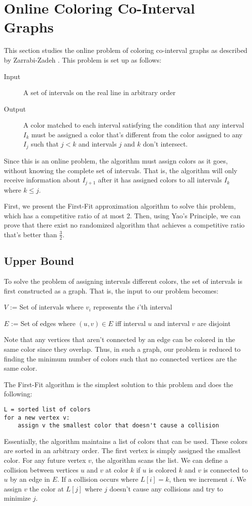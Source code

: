 \section{Online Coloring Co-Interval Graphs}
This section studies the online problem of coloring co-interval graphs as described by Zarrabi-Zadeh \cite{zarrabi}.
This problem is set up as follows:

\begin{description}
	\item[Input] A set of intervals on the real line in arbitrary order
	\item[Output] A color matched to each interval satisfying the condition that any interval $I_k$ must be assigned a color that's different from the color assigned to any $I_j$ such that $j < k$ and intervals $j$ and $k$ don't intersect.
\end{description}

Since this is an online problem, the algorithm must assign colors as it goes, without knowing the complete set of intervals. That is, the algorithm will only receive information about $I_{j+1}$ after it has assigned colors to all intervals $I_k$ where $k \leq j$.

First, we present the First-Fit approximation algorithm to solve this problem, which has a competitive ratio of at most 2. Then, using Yao's Principle, we can prove that there exist no randomized algorithm that achieves a competitive ratio that's better than $\frac{3}{2}$.
\subsection{Upper Bound}
To solve the problem of assigning intervals different colors, the set of intervals is first constructed as a graph. That is, the input to our problem becomes:

$V$ := Set of intervals where $v_i$ represents the $i$'th interval

$E$ := Set of edges where $(u,v) \in E$ iff interval $u$ and interval $v$ are disjoint

Note that any vertices that aren't connected by an edge can be colored in the same color since they overlap. Thus, in such a graph, our problem is reduced to finding the minimum number of colors such that no connected vertices are the same color.

The First-Fit algorithm is the simplest solution to this problem and does the following:
\begin{verbatim}
L = sorted list of colors
for a new vertex v:
    assign v the smallest color that doesn't cause a collision
\end{verbatim}
Essentially, the algorithm maintains a list of colors that can be used. These colors are sorted in an arbitrary order. The first vertex is simply assigned the smallest color. For any future vertex $v$, the algorithm scans the list. We can define a collision between vertices $u$ and $v$ at color $k$ if $u$ is colored $k$ and $v$ is connected to $u$ by an edge in $E$. If a collision occurs where $L[i] = k$, then we increment $i$. We assign $v$ the color at $L[j]$ where $j$ doesn't cause any collisions and try to minimize $j$.

